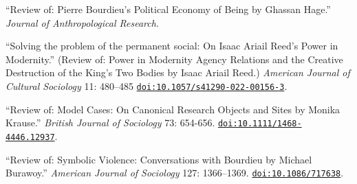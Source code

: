 
\ind ``Review of: Pierre Bourdieu’s Political Economy of Being by Ghassan Hage.'' {\em Journal of Anthropological Research}.

\ind ``Solving the problem of the permanent social: On Isaac Ariail Reed's Power in Modernity.'' (Review of: Power in Modernity Agency Relations and the Creative Destruction of the King’s Two Bodies by Isaac Ariail Reed.) {\em American Journal of Cultural Sociology}  11: 480–485 \href{https://doi.org/10.1057/s41290-022-00156-3}{\nolinkurl{doi:10.1057/s41290-022-00156-3}}.

\ind ``Review of: Model Cases: On Canonical Research Objects and Sites by Monika Krause.'' {\em British Journal of Sociology} 73: 654-656. \href{https://doi.org/10.1111/1468-4446.12937}{\nolinkurl{doi:10.1111/1468-4446.12937}}. 

\ind ``Review of: Symbolic Violence: Conversations with Bourdieu by Michael Burawoy.'' {\em American Journal of Sociology} 127: 1366–1369. \href{https://doi.org/10.1086/717638}{\nolinkurl{doi:10.1086/717638}}.
